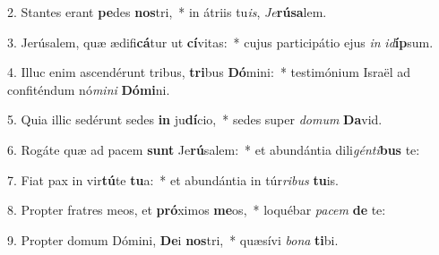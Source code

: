 2. Stantes erant \textbf{pe}des \textbf{nos}tri,~*  in átriis tu\textit{is}, \textit{Je}\textbf{rú}\textbf{sa}lem.\

3. Jerúsalem, quæ ædifi\textbf{cá}tur ut \textbf{cí}vitas:~*  cujus participátio ejus \textit{in} \textit{id}\textbf{íp}sum.\

4. Illuc enim ascendérunt tribus, \textbf{tri}bus \textbf{Dó}mini:~*  testimónium Israël ad confiténdum nó\textit{mi}\textit{ni} \textbf{Dó}\textbf{mi}ni.\

5. Quia illic sedérunt sedes \textbf{in} ju\textbf{dí}cio,~*  sedes super \textit{do}\textit{mum} \textbf{Da}vid.\

6. Rogáte quæ ad pacem \textbf{sunt} Je\textbf{rú}salem:~*  et abundántia dili\textit{gén}\textit{ti}\textbf{bus} te:\

7. Fiat pax in vir\textbf{tú}te \textbf{tu}a:~*  et abundántia in túr\textit{ri}\textit{bus} \textbf{tu}is.\

8. Propter fratres meos, et \textbf{pró}ximos \textbf{me}os,~*  loquébar \textit{pa}\textit{cem} \textbf{de} te:\

9. Propter domum Dómini, \textbf{De}i \textbf{nos}tri,~*  quæsívi \textit{bo}\textit{na} \textbf{ti}bi.\

